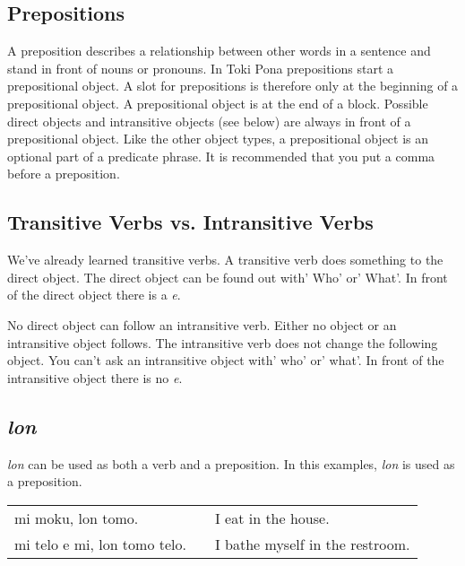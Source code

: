 %
\subsection*{Prepositions}
%
A preposition describes a relationship between other words in a sentence and stand in front of nouns or pronouns. 
In Toki Pona prepositions start a prepositional object. 
A slot for prepositions is therefore only at the beginning of a prepositional object. 
A prepositional object is at the end of a block. 
Possible direct objects and intransitive objects (see below) are always in front of a prepositional object.
Like the other object types, a prepositional object is an optional part of a predicate phrase. 
It is recommended that you put a comma before a preposition.
%
\subsection*{Transitive Verbs vs. Intransitive Verbs}
%
We've already learned transitive verbs. 
A transitive verb does something to the direct object. 
The direct object can be found out with' Who' or' What'. 
In front of the direct object there is a \textit{e}.

No direct object can follow an intransitive verb. 
Either no object or an intransitive object follows. 
The intransitive verb does not change the following object. 
You can't ask an intransitive object with' who' or' what'.
In front of the intransitive object there is no \textit{e}.
%
\subsection*{\textit{lon}}
%
\textit{lon} can be used as both a verb and a preposition. 
In this examples, \textit{lon} is used as a preposition.

\begin{supertabular}{p{5,5cm}|ll}
mi moku, lon tomo. && I eat in the house. \\
mi telo e mi, lon tomo telo. && I bathe myself in the restroom. \\
\end{supertabular} 


